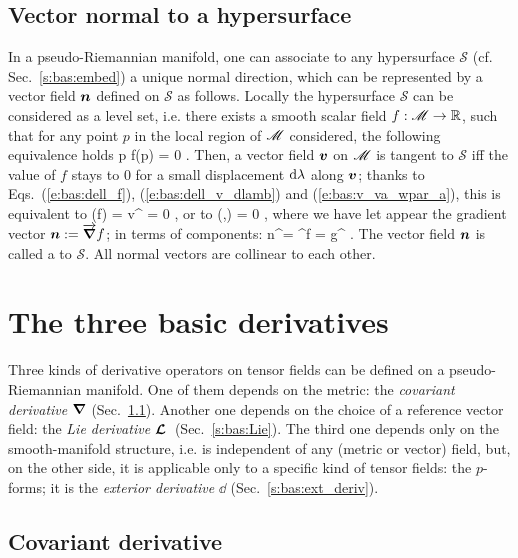 \subsection{Vector normal to a hypersurface} \label{s:bas:hyp_normal}

In a pseudo-Riemannian manifold, one can associate to any hypersurface
$\mathscr{S}$ (cf. Sec.~\ref{s:bas:embed}) a unique normal direction, which can
be represented by a vector field $\bm{n}$ defined on $\mathscr{S}$ as follows.
Locally the hypersurface $\mathscr{S}$ can be considered as a level set, i.e.
there exists a smooth scalar field $f:\mathscr{M} \rightarrow \mathbb{R}$, such that for
any point $p$ in the local region of $\mathscr{M}$ considered, the following equivalence
holds
\be
    p\in {} \iff f(p) = 0 .
\ee
Then, a vector field $\bm{v}$ on $\mathscr{M}$ is tangent to $\mathscr{S}$ iff
the value of $f$ stays to $0$ for a small displacement
$\mathrm{d}\lambda$ along $\bm{v}$; thanks to Eqs.~(\ref{e:bas:dell_f}),
(\ref{e:bas:dell_v_dlamb}) and (\ref{e:bas:v_va_wpar_a}), this is equivalent to
\be
    (f) = v^\mu {} = 0 ,
\ee
or to
\be
    (,) = 0 ,
\ee
where we have let appear the gradient vector $\bm{n} := \overrightarrow{\bm{\nabla}} f$; in
terms of components:
\be
    n^\alpha = \nabla^\alpha f = g^{\alpha\mu}  .
\ee
The vector field $\bm{n}$ is called a 
 to $\mathscr{S}$. All normal vectors are collinear to each other.




\section{The three basic derivatives}

Three kinds of derivative operators on tensor fields can be defined on a
pseudo-Riemannian manifold. One of them depends on the metric:
the \emph{covariant derivative} $\bm{\nabla}$ (Sec.~\ref{s:bas:cov_deriv}).
Another one depends on the choice of a
reference vector field: the \emph{Lie derivative} $\bm{\mathcal{L}}_{\bm{}}\,$ (Sec.~\ref{s:bas:Lie}).
The third one depends only on the smooth-manifold structure, i.e.
is independent of any (metric or vector) field, but, on the other side,
it is applicable
only to a specific kind of tensor fields: the $p$-forms; it is the
\emph{exterior derivative} $\dd$ (Sec.~\ref{s:bas:ext_deriv}).


\subsection{Covariant derivative} \label{s:bas:cov_deriv}


